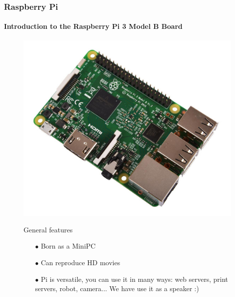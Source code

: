 \documentclass{beamer}
\begin{document}
\begin{frame}
\frametitle{\textbf{Raspberry Pi}}
\framesubtitle{\textbf{Introduction to the Raspberry Pi 3 Model B Board}}
\begin{figure}
\centering
\includegraphics[scale=0.15]{imgs/rasp3b.jpg}
\begin{block}{General features}
\begin{itemize}
\item[$\bullet$] Born as a MiniPC
\item[$\bullet$] Can reproduce HD movies
\item[$\bullet$] Pi is versatile, you can use it in many ways: web servers, print servers, robot, camera... We have use it as a speaker :)
\end{itemize}
\end{block}
\end{figure}
\end{frame}

\end{document}
